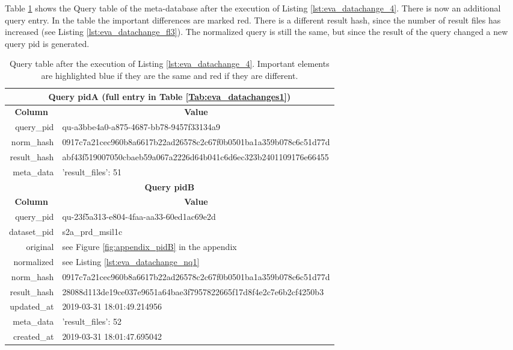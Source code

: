 \documentclass[draft,final]{vutinfth} %
\begin{document}
\begin{enumerate}
	Table \ref{Tab:eva_datachanges3} shows the Query table of the meta-database after the execution of Listing \ref{lst:eva_datachange_4}. There is now an additional query entry. In the table the important differences are marked red. There is a different result hash, since the number of result files has increased (see Listing \ref{lst:eva_datachange_fl3}). The normalized query is still the same, but since the result of the query changed a new query pid is generated. 
	
	\begin{table}[]
		\caption{Query table after the execution of Listing \ref{lst:eva_datachange_4}. Important elements are highlighted blue if they are the same and red if they are different.}
		\centering
		\begin{tabular}{|r|l|}
			\hline \multicolumn{2}{|c|}{\textbf{Query pidA (full entry in Table \ref{Tab:eva_datachanges1})}} \\
			\hline \multicolumn{1}{|c|}{\textbf{Column}}  &  \multicolumn{1}{c|}{\textbf{Value}} \\ \hline
			query\_pid & {\color{red}qu-a3bbe4a0-a875-4687-bb78-9457f33134a9}  \\ 
			norm\_hash & {\color{blue}0917c7a21cec960b8a6617b22ad26578c2c67f0b0501ba1a359b078c6c51d77d}  \\
			result\_hash & {\color{red}abf43f519007050cbaeb59a067a2226d64b041c6d6ec323b2401109176e66455}   \\
			meta\_data & {'result\_files': 51}  \\
			\hline \multicolumn{2}{|c|}{\textbf{Query pidB}} \\
			\hline \multicolumn{1}{|c|}{\textbf{Column}}  &  \multicolumn{1}{c|}{\textbf{Value}} \\ \hline
			query\_pid & { \color{red} qu-23f5a313-e804-4faa-aa33-60ed1ac69e2d}  \\ 
			dataset\_pid & s2a\_prd\_msil1c  \\ 
			original & see Figure \ref{fig:appendix_pidB} in the appendix \\
			normalized & see Listing \ref{lst:eva_datachange_nq1}  \\
			norm\_hash & {\color{blue}0917c7a21cec960b8a6617b22ad26578c2c67f0b0501ba1a359b078c6c51d77d}  \\
			result\_hash & {\color{red}28088d113de19ce037e9651a64bae3f7957822665f17d8f4e2c7e6b2cf4250b3 }  \\
			updated\_at & 2019-03-31 18:01:49.214956   \\
			meta\_data & {\color{red}'result\_files': 52}  \\
			created\_at & 2019-03-31 18:01:47.695042   \\ \hline
		\end{tabular}
		\label{Tab:eva_datachanges3}
	\end{table}
	

\end{enumerate}
\end{document}
